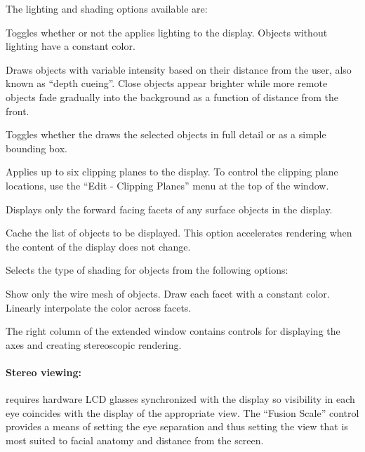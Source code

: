 The lighting and shading options available are:
%
\begin{description}
   Toggles whether or not the \viewer{} applies
  lighting to the display.  Objects without lighting have a constant
  color.
        
   Draws objects with variable intensity based on their
  distance from the user, also known as ``depth cueing''.  Close
  objects appear brighter while more remote objects fade gradually
  into the background as a function of distance from the front.
  
   Toggles whether the \viewer{} draws the selected
  objects in full detail or as a simple bounding box.
  
   Applies up to six clipping planes to the
  display.  To control the clipping plane locations, use the ``Edit
  -\ra{} Clipping Planes'' menu at the top of the \viewer{} window.
  
   Displays only the forward facing facets of any
  surface objects in the display.
  
   Cache the list of objects to be displayed.
  This option accelerates rendering when the content of the display
  does not change.

   Selects the type of shading for objects from the
        following options:
        \begin{description}
           Show only the wire mesh of objects.
           Draw each facet with a constant color.
           Linearly interpolate the color across facets. 
        \end{description}
\end{description}

The right column of the extended \viewer{} window contains controls
for displaying the axes and creating stereoscopic rendering.  

\paragraph{Stereo viewing: } requires hardware LCD glasses synchronized
with the display so visibility in each eye coincides with the
display of the appropriate view.  The ``Fusion Scale'' control provides a
means of setting the eye separation and thus setting the view that is most
suited to facial anatomy and distance from the screen.


